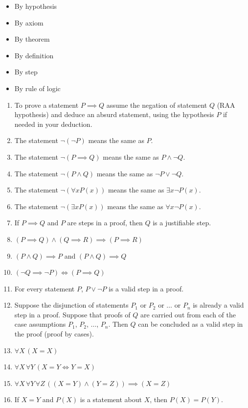 \documentclass[
  twoside,
  12pt,
  letterpaper,
  fleqn]{article}
\providecommand{\tightlist}{%
  \setlength{\itemsep}{0pt}\setlength{\parskip}{0pt}}\usepackage{longtable,booktabs,array}
\theoremstyle{definition}
\theoremstyle{definition}
\theoremstyle{plain}
\theoremstyle{plain}
\theoremstyle{remark}
\begin{document}
\begin{itemize}
\tightlist
\item
  By hypothesis
\item
  By axiom
\item
  By theorem
\item
  By definition
\item
  By step
\item
  By rule of logic
\end{itemize}

\begin{enumerate}
\def\labelenumi{\arabic{enumi}.}
\setcounter{enumi}{2}
\tightlist
\item
  To prove a statement \(P\implies Q\) assume the negation of statement
  \(Q\) (RAA hypothesis) and deduce an absurd statement, using the
  hypothesis \(P\) if needed in your deduction.
\item
  The statement \(\neg (\neg P)\) means the same as \(P\).
\item
  The statement \(\neg (P\implies Q)\) means the same as
  \(P\land \neg Q\).
\item
  The statement \(\neg(P\land Q)\) means the same as
  \(\neg P \lor \neg Q\).
\item
  The statement \(\neg(\forall x P(x))\) means the same as
  \(\exists x \neg P(x)\).
\item
  The statement \(\neg(\exists x P(x))\) means the same as
  \(\forall x \neg P(x)\).
\item
  If \(P\implies Q\) and \(P\) are steps in a proof, then \(Q\) is a
  justifiable step.
\item
  \((P\implies Q) \land (Q\implies R) \implies (P\implies R)\)
\item
  \((P\land Q)\implies P\) and \((P\land Q)\implies Q\)
\item
  \((\neg Q \implies \neg P)\Longleftrightarrow (P\implies Q)\)
\item
  For every statement \(P\), \(P\lor \neg P\) is a valid step in a
  proof.
\item
  Suppose the disjunction of statements \(P_1\) or \(P_2\) or \(\ldots\)
  or \(P_n\) is already a valid step in a proof. Suppose that proofs of
  \(Q\) are carried out from each of the case assumptions \(P_1\),
  \(P_2\), \(\ldots\), \(P_n.\) Then \(Q\) can be concluded as a valid
  step in the proof (proof by cases).
\item
  \(\forall X \, (X=X)\)
\item
  \(\forall X \, \forall Y \, (X=Y \Longleftrightarrow Y=X)\)
\item
  \(\forall X \, \forall Y \, \forall Z \, ( (X=Y) \land (Y=Z) ) \implies (X=Z)\)
\item
  If \(X=Y\) and \(P(X)\) is a statement about \(X\), then
  \(P(X)=P(Y)\).
\end{enumerate}
\end{document}
